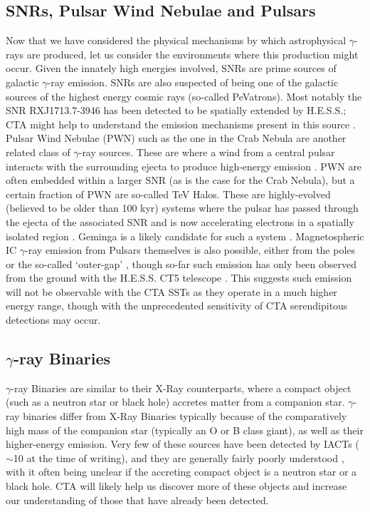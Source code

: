 \subsection{SNRs, Pulsar Wind Nebulae and Pulsars}
Now that we have considered the physical mechanisms by which astrophysical $\gamma$-rays are produced, let us consider the environments where this production might occur. Given the innately high energies involved, SNRs are prime sources of galactic $\gamma$-ray emission. SNRs are also suspected of being one of the galactic sources of the highest energy cosmic rays (so-called PeVatrons). Most notably the SNR RXJ1713.7-3946 has been detected to be spatially extended by H.E.S.S.; CTA might help to understand the emission mechanisms present in this source \cite{rxjcta}. Pulsar Wind Nebulae (PWN) such as the one in the Crab Nebula are another related class of $\gamma$-ray sources. These are where a wind from a central pulsar interacts with the surrounding ejecta to produce high-energy emission \cite{magiccrab}. PWN are often embedded within a larger SNR (as is the case for the Crab Nebula), but a certain fraction of PWN are so-called TeV Halos. These are highly-evolved (believed to be older than 100 kyr) systems where the pulsar has passed through the ejecta of the associated SNR and is now accelerating electrons in a spatially isolated region \cite{tevhalo}. Geminga is a likely candidate for such a system \cite{geminga}. Magnetospheric IC $\gamma$-ray emission from Pulsars themselves is also possible, either from the poles or the so-called `outer-gap' \cite{gammapulsar}, though so-far such emission has only been observed from the ground with the H.E.S.S. CT5 telescope \cite{hesspulsar}. This suggests such emission will not be observable with the CTA SSTs as they operate in a much higher energy range, though with the unprecedented sensitivity of CTA serendipitous detections may occur.

\subsection{$\gamma$-ray Binaries}
$\gamma$-ray Binaries are similar to their X-Ray counterparts, where a compact object (such as a neutron star or black hole) accretes matter from a companion star. $\gamma$-ray binaries differ from X-Ray Binaries typically because of the comparatively high mass of the companion star (typically an O or B class giant), as well as their higher-energy emission. Very few of these sources have been detected by IACTs ($\sim$10 at the time of writing), and they are generally fairly poorly understood \cite{scienceCTA}, with it often being unclear if the accreting compact object is a neutron star or a black hole. CTA will likely help us discover more of these objects and increase our understanding of those that have already been detected.

